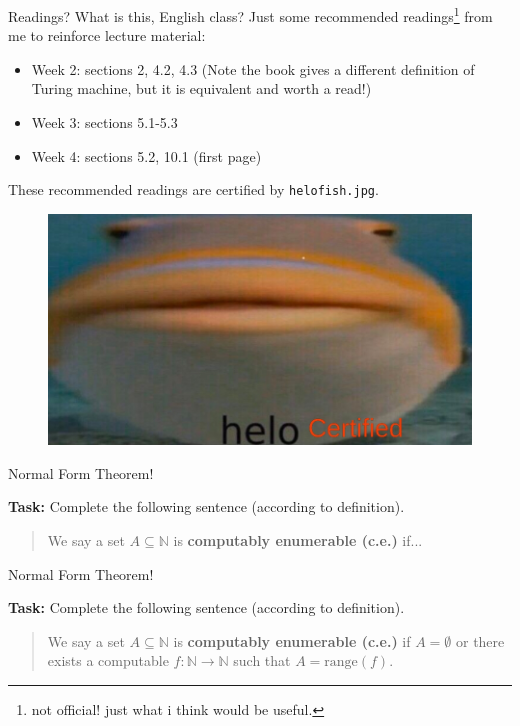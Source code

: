 \documentclass{beamer}
\begin{document}
\begin{frame}{Readings? What is this, English class?}
Just some recommended readings\footnote{not official! just what i think would be useful.} from me to reinforce lecture material:
\begin{itemize}
\item Week 2: sections 2, 4.2, 4.3 (Note the book gives a different definition of Turing machine, but it is equivalent and worth a read!)
\item Week 3: sections 5.1-5.3
\item Week 4: sections 5.2, 10.1 (first page)
\end{itemize}
These recommended readings are certified by \texttt{helo\textunderscore fish.jpg}.
\begin{figure}[h]
\includegraphics[scale=0.3]{img/helo_fish_certified.jpg}
\end{figure}
\end{frame}

\begin{frame}{Normal Form Theorem!}

\textbf{Task:} Complete the following sentence (according to definition).

\begin{quotation}
We say a set $A \subseteq \mathbb N$ is \textbf{computably enumerable (c.e.)} if...
\end{quotation}
\end{frame}

\begin{frame}{Normal Form Theorem!}

\textbf{Task:} Complete the following sentence (according to definition).

\begin{quotation}
We say a set $A \subseteq \mathbb N$ is \textbf{computably enumerable (c.e.)} if $A = \emptyset$ or there exists a computable $f: \mathbb N \to \mathbb N$ such that $A = \text{range}(f)$. 
\end{quotation}
\end{frame}
\end{document}
